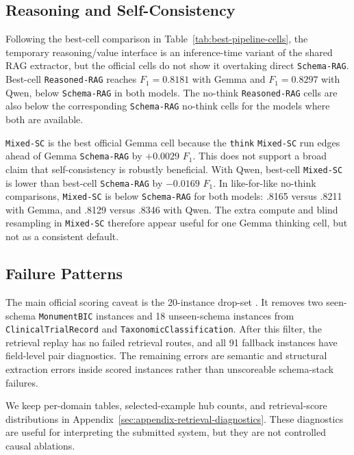 \subsection{Reasoning and Self-Consistency}

Following the best-cell comparison in Table~\ref{tab:best-pipeline-cells}, the temporary reasoning/value interface is an inference-time variant of the shared RAG extractor, but the official cells do not show it overtaking direct \texttt{Schema-RAG}. Best-cell \texttt{Reasoned-RAG} reaches \(F_1=0.8181\) with Gemma and \(F_1=0.8297\) with Qwen, below \texttt{Schema-RAG} in both models. The no-think \texttt{Reasoned-RAG} cells are also below the corresponding \texttt{Schema-RAG} no-think cells for the models where both are available.

\texttt{Mixed-SC} is the best official Gemma cell because the \texttt{think} \texttt{Mixed-SC} run edges ahead of Gemma \texttt{Schema-RAG} by \(+0.0029\) \(F_1\). This does not support a broad claim that self-consistency is robustly beneficial. With Qwen, best-cell \texttt{Mixed-SC} is lower than best-cell \texttt{Schema-RAG} by \(-0.0169\) \(F_1\). In like-for-like no-think comparisons, \texttt{Mixed-SC} is below \texttt{Schema-RAG} for both models: .8165 versus .8211 with Gemma, and .8129 versus .8346 with Qwen. The extra compute and blind resampling in \texttt{Mixed-SC} therefore appear useful for one Gemma thinking cell, but not as a consistent default.

\subsection{Failure Patterns}

The main official scoring caveat is the 20-instance drop-set \cite{gensie2026overview}. It removes two seen-schema \texttt{MonumentBIC} instances and 18 unseen-schema instances from \texttt{ClinicalTrialRecord} and \texttt{TaxonomicClassification}. After this filter, the retrieval replay has no failed retrieval routes, and all 91 fallback instances have field-level pair diagnostics. The remaining errors are semantic and structural extraction errors inside scored instances rather than unscoreable schema-stack failures.

We keep per-domain tables, selected-example hub counts, and retrieval-score distributions in Appendix~\ref{sec:appendix-retrieval-diagnostics}. These diagnostics are useful for interpreting the submitted system, but they are not controlled causal ablations.
